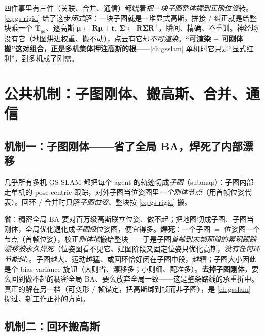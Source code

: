\begin{insight}
四件事里有三件（关联、合并、通信）都绕着\emph{把一块子图整体挪到正确位姿}转。\cref{eq:gs-rigid} 给了这步\emph{闭式}解：一块子图就是一堆显式高斯，拼接 / 纠正就是给整块乘一个 $\mathbf T_{ga}$、逐高斯 $\boldsymbol\mu\!\leftarrow\!\mathbf R\boldsymbol\mu+\mathbf t,\ \boldsymbol\Sigma\!\leftarrow\!\mathbf R\boldsymbol\Sigma\mathbf R^\top$，瞬间、精确、不重训。神经场没有它（地图烘进权重、搬不动），点云有它却\emph{不可渲染}。\textbf{“可渲染 $+$ 可刚体搬”这对组合，正是多机集体押注高斯的根}——\cref{ch:gsslam} 单机时它只是“显式红利”，到多机成了刚需。
\end{insight}

\section{公共机制：子图刚体、搬高斯、合并、通信}
\label{sec:mags-mech}

\subsection{机制一：子图刚体——省了全局 BA，焊死了内部漂移}

几乎所有多机 GS-SLAM 都把每个 agent 的轨迹切成\emph{子图}（submap）：子图内部走单机的 pose-centric 跟踪，对外子图当位姿图里\emph{一个刚体节点}（用首帧位姿代表）。回环 / 合并时只解\emph{子图位姿}、整块按 \cref{eq:gs-rigid} 搬。

\begin{insight}
\textbf{省}：稠密全局 BA 要对百万级高斯联立位姿、做不起；把地图切成子图、子图当刚体，全局优化退化成\emph{子图级}位姿图，便宜得多。\textbf{焊死}：一个子图 $=$ 位姿图一个节点（首帧位姿），校正\emph{刚体地}搬给整块——于是子图\emph{首帧到末帧那段的累积跟踪漂移被永久焊死}（位姿图看不见它、建图阶段又固定位姿只优化高斯，\emph{没有任何环节能纠}）。子图越大、运动越猛、或回环恰好闭在子图中段，越糟；子图大小因此是个 bias-variance 旋钮（大则省、漂移多；小则细、配准多）。\textbf{去掉子图刚体}，要么回到做不起的稠密全局 BA、要么放弃全局一致——这是整条路线的承重折中。真正的解在另一档（可变形 / 帧锚定，把高斯绑到帧而非子图），是 \cref{ch:gsslam} 提过、新工作正补的方向。
\end{insight}

\subsection{机制二：回环搬高斯}

